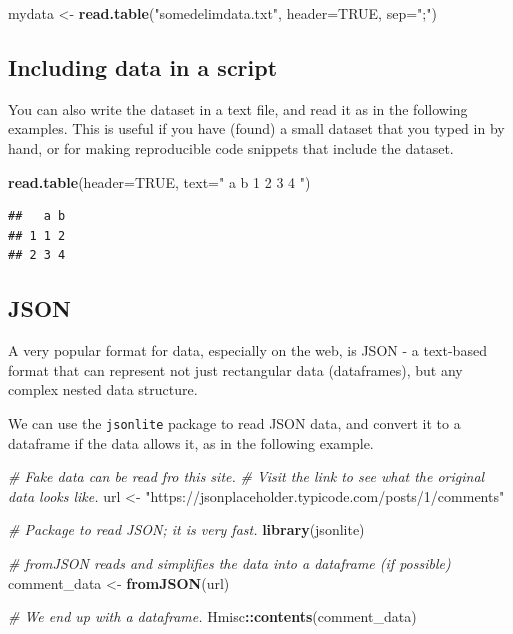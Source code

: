 \documentclass[]{book}
\newenvironment{Shaded}{\begin{snugshade}}{\end{snugshade}}
\newcommand{\CommentTok}[1]{\textcolor[rgb]{0.56,0.35,0.01}{\textit{#1}}}
\newcommand{\DataTypeTok}[1]{\textcolor[rgb]{0.13,0.29,0.53}{#1}}
\newcommand{\KeywordTok}[1]{\textcolor[rgb]{0.13,0.29,0.53}{\textbf{#1}}}
\newcommand{\NormalTok}[1]{#1}
\newcommand{\OperatorTok}[1]{\textcolor[rgb]{0.81,0.36,0.00}{\textbf{#1}}}
\newcommand{\OtherTok}[1]{\textcolor[rgb]{0.56,0.35,0.01}{#1}}
\newcommand{\StringTok}[1]{\textcolor[rgb]{0.31,0.60,0.02}{#1}}
\begin{document}
\begin{Shaded}
\begin{Highlighting}[]
\NormalTok{mydata <-}\StringTok{ }\KeywordTok{read.table}\NormalTok{(}\StringTok{"somedelimdata.txt"}\NormalTok{, }\DataTypeTok{header=}\OtherTok{TRUE}\NormalTok{, }\DataTypeTok{sep=}\StringTok{";"}\NormalTok{)}
\end{Highlighting}
\end{Shaded}

\hypertarget{including-data-in-a-script}{%
\subsection{Including data in a script}\label{including-data-in-a-script}}

You can also write the dataset in a text file, and read it as in the following examples. This is useful if you have (found) a small dataset that you typed in by hand, or for making reproducible code snippets that include the dataset.

\begin{Shaded}
\begin{Highlighting}[]
\KeywordTok{read.table}\NormalTok{(}\DataTypeTok{header=}\OtherTok{TRUE}\NormalTok{, }\DataTypeTok{text=}\StringTok{"}
\StringTok{a b}
\StringTok{1 2}
\StringTok{3 4}
\StringTok{"}\NormalTok{)}
\end{Highlighting}
\end{Shaded}

\begin{verbatim}
##   a b
## 1 1 2
## 2 3 4
\end{verbatim}

\hypertarget{json}{%
\subsection{JSON}\label{json}}

A very popular format for data, especially on the web, is JSON - a text-based format that can represent not just rectangular data (dataframes), but any complex nested data structure.

We can use the \texttt{jsonlite} package to read JSON data, and convert it to a dataframe if the data allows it, as in the following example.

\begin{Shaded}
\begin{Highlighting}[]
\CommentTok{# Fake data can be read fro this site.}
\CommentTok{# Visit the link to see what the original data looks like.}
\NormalTok{url <-}\StringTok{ "https://jsonplaceholder.typicode.com/posts/1/comments"}

\CommentTok{# Package to read JSON; it is very fast.}
\KeywordTok{library}\NormalTok{(jsonlite)}

\CommentTok{# fromJSON reads and simplifies the data into a dataframe (if possible)}
\NormalTok{comment_data <-}\StringTok{ }\KeywordTok{fromJSON}\NormalTok{(url)}

\CommentTok{# We end up with a dataframe.}
\NormalTok{Hmisc}\OperatorTok{::}\KeywordTok{contents}\NormalTok{(comment_data)}
\end{Highlighting}
\end{Shaded}
\end{document}
